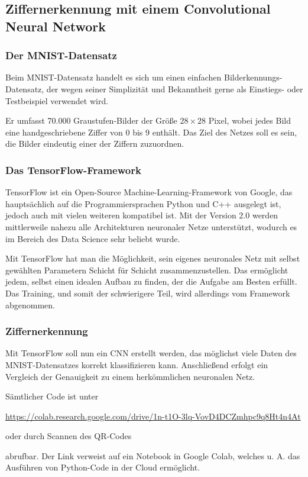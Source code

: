 \documentclass[12pt,a4]{article}
\begin{document}
\subsection{Ziffernerkennung mit einem Convolutional Neural Network}\label{sec:Application}
\subsubsection{Der MNIST-Datensatz}\label{sec:MNISTDataset}
Beim MNIST-Datensatz handelt es sich um einen einfachen Bilderkennungs-Datensatz, der wegen seiner Simplizität und Bekanntheit gerne als Einstiegs- oder Testbeispiel verwendet wird.

Er umfasst 70.000 Graustufen-Bilder der Größe $28 \times 28$ Pixel, wobei jedes Bild eine handgeschriebene Ziffer von 0 bis 9 enthält. Das Ziel des Netzes soll es sein, die Bilder eindeutig einer der Ziffern zuzuordnen.

\subsubsection{Das TensorFlow-Framework}\label{sec:TensorFlow}
TensorFlow ist ein Open-Source Machine-Learning-Framework von Google, das hauptsächlich auf die Programmiersprachen Python und C++ ausgelegt ist, jedoch auch mit vielen weiteren kompatibel ist. Mit der Version 2.0 werden mittlerweile nahezu alle Architekturen neuronaler Netze unterstützt, wodurch es im Bereich des Data Science sehr beliebt wurde.

Mit TensorFlow hat man die Möglichkeit, sein eigenes neuronales Netz mit selbst gewählten Parametern Schicht für Schicht zusammenzustellen. Das ermöglicht jedem, selbst einen idealen Aufbau zu finden, der die Aufgabe am Besten erfüllt. Das Training, und somit der schwierigere Teil, wird allerdings vom Framework abgenommen.

\subsubsection{Ziffernerkennung}
Mit TensorFlow soll nun ein CNN erstellt werden, das möglichst viele Daten des MNIST-Datensatzes korrekt klassifizieren kann. Anschließend erfolgt ein Vergleich der Genauigkeit zu einem herkömmlichen neuronalen Netz.

Sämtlicher Code ist unter
\begin{center}
\footnotesize\url{https://colab.research.google.com/drive/1n-t1O-3lq-VovD4DCZmhpc9q8Ht4n4At}
\end{center} 
oder durch Scannen des QR-Codes
\begin{center}
\end{center}
abrufbar. Der Link verweist auf ein Notebook in Google Colab, welches u. A. das Ausführen von Python-Code in der Cloud ermöglicht.
\end{document}
